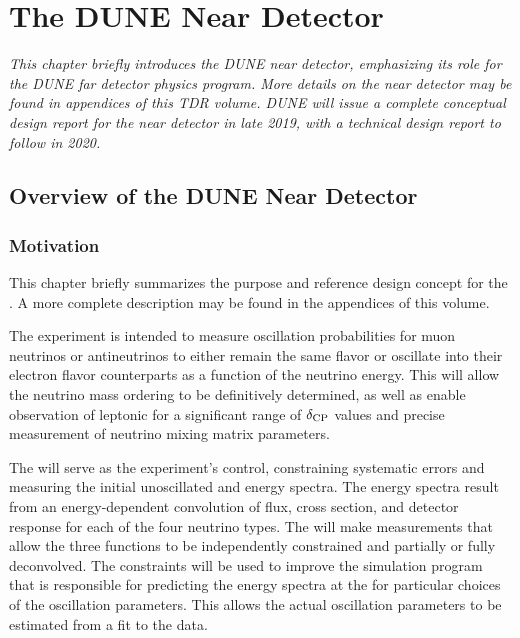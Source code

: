 \chapter{The DUNE Near Detector} %
\label{ch:exsum-nd}

\textit{This chapter briefly introduces the DUNE near detector, emphasizing its role for the DUNE far detector physics program.  More details on the near detector may be found in  appendices of this TDR volume.  DUNE will issue a complete conceptual design report for the near detector in late 2019, with a technical design report to follow in 2020.}

\section{Overview of the DUNE Near Detector}
\label{sec:exsum-nd-overview}


\subsection{Motivation}
\label{sec:exsum-nd-BriefOverview-need}

This chapter briefly summarizes the purpose and reference design concept for the  .  A more complete description may be found in the appendices of this volume.

The  experiment is intended to measure oscillation probabilities for muon neutrinos or antineutrinos to either remain the same flavor or oscillate into their electron flavor counterparts as a function of the neutrino energy. This will allow the neutrino mass ordering to be definitively determined, as well as enable observation of leptonic  for a significant range of $\delta_{\rm{CP}}$ values and precise measurement of %
neutrino mixing matrix parameters.

The  will serve as the experiment's control,
 constraining systematic errors and measuring the initial unoscillated \numu and \nue energy spectra. %
 The energy spectra result from an energy-dependent convolution of flux, cross section, and detector response for each of the four neutrino types.
  The  will make measurements that allow the three functions to be independently constrained and partially or fully deconvolved. The constraints will be used to improve the simulation program that is responsible for predicting the energy spectra at the  for particular choices of the oscillation parameters. This allows the actual oscillation parameters to be estimated from a fit to the  data. 
 
